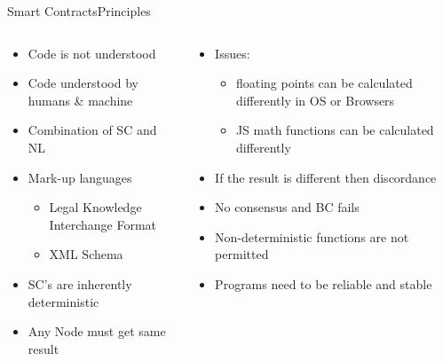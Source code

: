 \documentclass[pdf,table]{beamer}
\begin{document}
\begin{frame}{Smart Contracts}{Principles}
	\begin{columns}[T]
		\begin{column}{0.48\textwidth}
			\begin{itemize}
				\item Code is not understood %
				\item Code understood by humans \& machine
				\item Combination of SC and NL %
				\item Mark-up languages
					\begin{itemize}
						\item Legal Knowledge Interchange Format
						\item XML Schema
					\end{itemize}
				\item SC's are inherently deterministic
				\item Any Node must get same result
			\end{itemize}
		\end{column}
		\begin{column}{0.48\textwidth}
			\begin{itemize}
			\item Issues:
					\begin{itemize}
						\item floating points can be calculated differently in OS or Browsers
						\item JS math functions can be calculated differently
					\end{itemize}
				\item If the result is different then discordance
				\item No consensus and BC fails %
				\item Non-deterministic functions are not permitted
				\item Programs need to be reliable and stable
			\end{itemize}
		\end{column}
	\end{columns}	
\end{frame}
\end{document}
